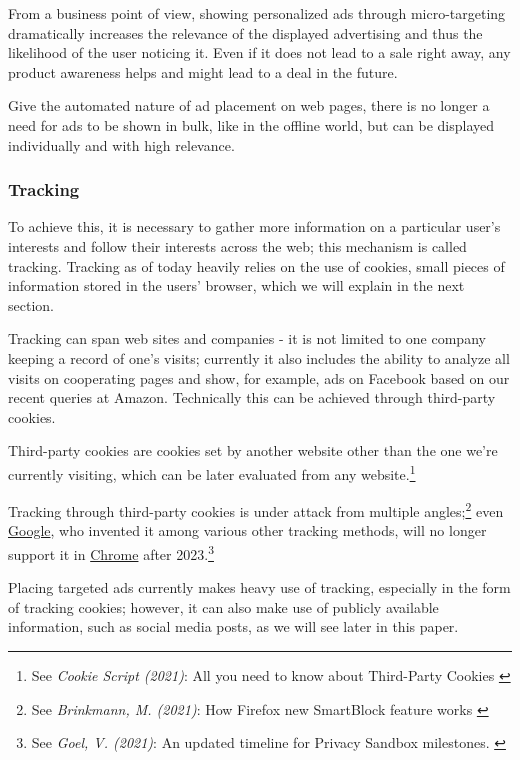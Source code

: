 From a business point of view, showing personalized ads through micro-targeting dramatically increases the relevance of the displayed advertising and thus the likelihood of the user noticing it. Even if it does not lead to a sale right away, any product awareness helps and might lead to a deal in the future. 

Give the automated nature of ad placement on web pages, there is no longer a need for ads to be shown in bulk, like in the offline world, but can be displayed individually and with high relevance. 

\subsubsection{Tracking}

To achieve this, it is necessary to gather more information on a particular user's interests and follow their interests across the web; this mechanism is called tracking. Tracking as of today heavily relies on the use of cookies, small pieces of information stored in the users' browser, which we will explain in the next section.

Tracking can span web sites and companies - it is not limited to one company keeping a record of one's visits; currently it also includes the ability to analyze all visits on cooperating pages and show, for example, ads on Facebook based on our recent queries at Amazon. Technically this can be achieved through third-party cookies.

Third-party cookies are cookies set by another website other than the one we're currently visiting, which can be later evaluated from any website.\footnote{See \textit{Cookie Script (2021)}: All you need to know about Third-Party Cookies \cite{mozillaBlog}}

Tracking through third-party cookies is under attack from multiple angles;\footnote{See \textit{Brinkmann, M. (2021)}: How Firefox new SmartBlock feature works \cite{mozillaBlog}} even \href{https://www.google.com/}{Google}, who invented it among various other tracking methods, will no longer support it in \href{https://www.google.com/chrome/}{Chrome} after 2023.\footnote{See \textit{Goel, V. (2021)}: An updated timeline for Privacy Sandbox milestones. \cite{sandboxDelay}}

Placing targeted ads currently makes heavy use of tracking, especially in the form of tracking cookies; however, it can also make use of publicly available information, such as social media posts, as we will see later in this paper.

